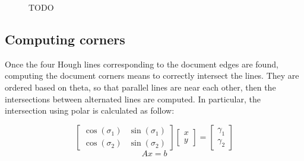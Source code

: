 \documentclass[a4paper]{article}
\begin{document}
\begin{figure}[H]
	\caption{TODO}
	\label{fig:hough}
\end{figure}

\subsection{Computing corners}

Once the four Hough lines corresponding to the document edges are found, computing the document corners means to correctly intersect the lines. They are ordered based on theta, so that parallel lines are near each other, then the intersections between alternated lines are computed. In particular, the intersection using polar is calculated as follow:

\begin{equation*}
	\begin{bmatrix} \cos(\sigma_1) & \sin(\sigma_1) \\ \cos(\sigma_2) & \sin(\sigma_2) \end{bmatrix}
	\begin{bmatrix} x \\ y \end{bmatrix}
	=
	\begin{bmatrix} \gamma_1 \\ \gamma_2 \end{bmatrix}
\end{equation*}
\begin{equation*}
	Ax = b
\end{equation*}
\end{document}
